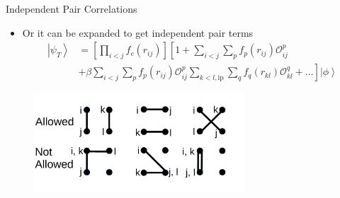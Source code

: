 \documentclass{beamer}
\newcommand{\ket}[1]{\left| #1 \right>}
\newcommand{\fpij}{f_p(r_{ij})}
\newcommand{\Opij}{\mathcal{O}_{ij}^p}
\newcommand{\fOpij}{\sum\limits_{i<j}\sum\limits_p \fpij\Opij}
\newcommand{\fqkl}{f_q(r_{kl})}
\newcommand{\Oqkl}{\mathcal{O}_{kl}^q}
\newcommand{\fOqklip}{\sum\limits_{k<l,\mathrm{ip}}\sum\limits_q \fqkl\Oqkl}
\begin{document}
\begin{frame}{Independent Pair Correlations}
\begin{itemize}
   \item Or it can be expanded to get independent pair terms
   \begin{equation*}
   \begin{split}
      \ket{\psi_T} &= \left[\prod\limits_{i<j}f_c(r_{ij})\right] \left[1+\fOpij\right. \\
      & + \left.\beta\fOpij\fOqklip + \ldots \right] \ket{\phi}
   \end{split}
   \end{equation*}
\end{itemize}
\begin{figure}[h]
   \centering
   \includegraphics[width=0.7\textwidth]{pairing.pdf}
\end{figure}
\end{frame}
\end{document}
